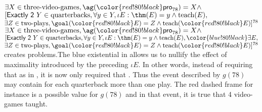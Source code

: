 \pex
\a 
$\exists X\in \text{three-video-games}, \ag({\color{red!80!black}\textsf{pro}_{78}}) = X \wedge $\\
$[\textsf{Exactly 2 } Y\in \text{quarterbacks}, \forall y \in Y, \iota E: \thm(E) = y \wedge \text{teach}(E),$\\
$\exists Z\in \text{two-plays}, \goal({\color{red!80!black} E}) = Z \wedge \text{teach}({\color{red!80!black} E})]^{78}$\\
\a 
$\exists X\in \text{three-video-games}, \ag({\color{red!80!black}\textsf{pro}_{78}}) = X \wedge $\\
$[\textsf{Exactly 2 } Y\in \text{quarterbacks}, \forall y \in Y, \iota E: \thm(E) = y \wedge \text{teach}(E), {\color{blue!80!black} \exists E,}$\\
$\exists Z\in \text{two-plays}, \goal({\color{red!80!black} E}) = Z \wedge \text{teach}({\color{red!80!black} E})]^{78}$\\
\xe
%
\clastxb creates problems.The blue existential in \clastxb allows us to nullify the effect of maximality introduced by the preceding $\iota E$. In other words, instead of requiring that  as in \clastxa, it is now only required that . Thus the event described by $g(78)$ may contain for each quarterback more than one play. The red dashed frame for instance is a possible value for $g(78)$ and in that event, it is true that 4 video-games taught.




